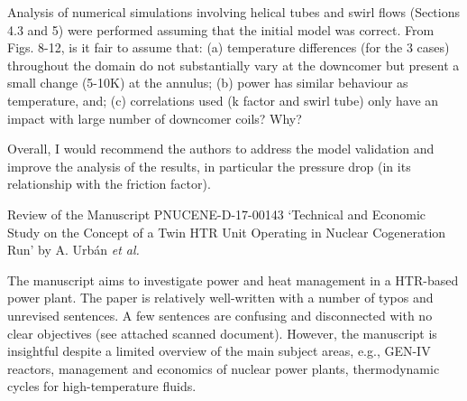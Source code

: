 \documentclass[14pt,twoside]{report}
\begin{document}
Analysis of numerical simulations involving helical tubes and swirl flows (Sections 4.3 and 5) were performed assuming that the initial model was correct. From Figs. 8-12, is it fair to assume that: (a) temperature differences (for the 3 cases) throughout the domain do not substantially vary at the downcomer but present a small change (5-10K) at the annulus; (b) power has similar behaviour as temperature, and; (c) correlations used (k factor and swirl tube) only have an impact with large number of downcomer coils? Why?

Overall, I would recommend the authors to address the model validation and improve the analysis of the results, in particular the pressure drop (in its relationship with the friction factor). 





\clearpage





\begin{center}
  {\Large Review of the Manuscript PNUCENE-D-17-00143 `Technical and Economic Study on the Concept of a Twin HTR Unit Operating in Nuclear Cogeneration Run' by A. Urb\'an {\it et al.}}
\end{center}

\medskip
The manuscript aims to investigate power and heat management in a HTR-based power plant. The paper is relatively well-written with a number of typos and unrevised sentences. A few sentences are confusing and disconnected with no clear objectives (see attached scanned document).  However, the manuscript is insightful despite a limited overview of the main subject areas, e.g., GEN-IV reactors, management and economics of nuclear power plants, thermodynamic cycles for high-temperature fluids.
\end{document}
